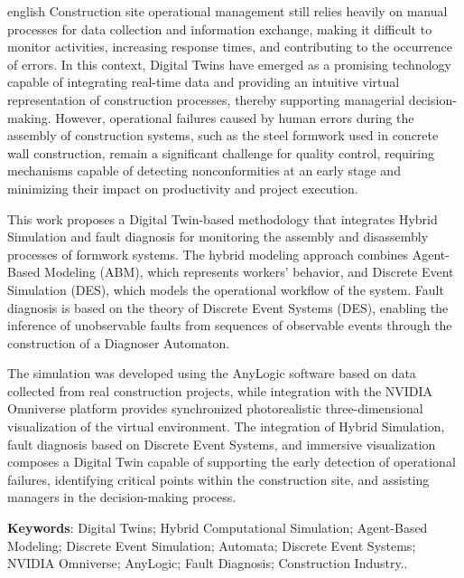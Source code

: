 \begin{resumo}[Abstract]
	\begin{otherlanguage*}{english}
		Construction site operational management still relies heavily on manual processes for data collection and information exchange, making it difficult to monitor activities, increasing response times, and contributing to the occurrence of errors. In this context, Digital Twins have emerged as a promising technology capable of integrating real-time data and providing an intuitive virtual representation of construction processes, thereby supporting managerial decision-making. However, operational failures caused by human errors during the assembly of construction systems, such as the steel formwork used in concrete wall construction, remain a significant challenge for quality control, requiring mechanisms capable of detecting nonconformities at an early stage and minimizing their impact on productivity and project execution.
		
		This work proposes a Digital Twin-based methodology that integrates Hybrid Simulation and fault diagnosis for monitoring the assembly and disassembly processes of formwork systems. The hybrid modeling approach combines Agent-Based Modeling (ABM), which represents workers' behavior, and Discrete Event Simulation (DES), which models the operational workflow of the system. Fault diagnosis is based on the theory of Discrete Event Systems (DES), enabling the inference of unobservable faults from sequences of observable events through the construction of a Diagnoser Automaton.
		
		The simulation was developed using the AnyLogic software based on data collected from real construction projects, while integration with the NVIDIA Omniverse platform provides synchronized photorealistic three-dimensional visualization of the virtual environment. The integration of Hybrid Simulation, fault diagnosis based on Discrete Event Systems, and immersive visualization composes a Digital Twin capable of supporting the early detection of operational failures, identifying critical points within the construction site, and assisting managers in the decision-making process.
		
		\vspace{\onelineskip}
		\noindent
		\textbf{Keywords}: Digital Twins; Hybrid Computational Simulation; Agent-Based Modeling; Discrete Event Simulation; Automata; Discrete Event Systems; NVIDIA Omniverse; AnyLogic; Fault Diagnosis; Construction Industry..
	\end{otherlanguage*}
\end{resumo}



